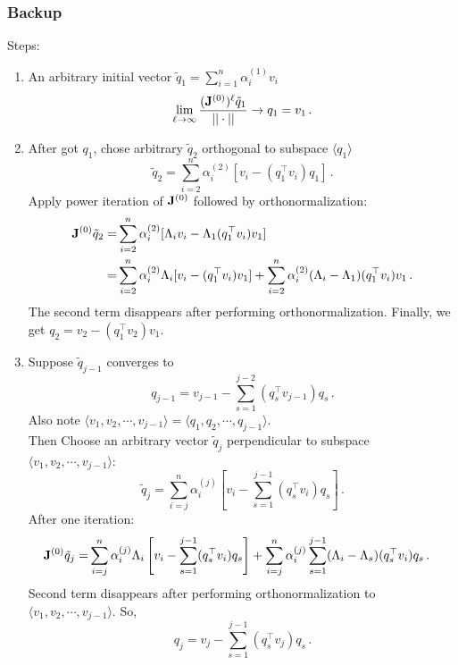 \documentclass[mathserif, handout]{beamer}
\begin{document}
\begin{frame}[allowframebreaks]
  \frametitle{Backup}
  Steps:
  \begin{enumerate}
  \item An arbitrary initial vector
    $\tilde{q}_{1}=\sum_{i=1}^{n}\alpha^{(1)}_{i}v_{i}$
    \[
    \lim_{\ell\to \infty }\frac{(\mathbf{J}^{(0)})^{\ell}\tilde{q}_{1}}{||\cdot||}
    \to q_{1}=v_{1}
    \,.
    \]

  \item After got $q_1$, chose arbitrary $\tilde{q}_{2}$ orthogonal to
    subspace $\langle q_{1} \rangle$
    \[
    \tilde{q}_{2}= \sum_{i=2}^{n}\alpha^{(2)}_{i}[v_{i}-(q_{1}^\top
    v_{i})q_{1}]
    \,.
    \]
    Apply power
    iteration of $\mathbf{J}^{(0)}$ followed by orthonormalization:
    \begin{align*}
      \mathbf{J}^{(0)}\tilde{q}_{2}= &\sum_{i=2}^{n}\alpha^{(2)}_{i}
      [\Lambda_{i}v_{i}-\Lambda_{1}(q_{1}^\top v_{i})v_{1}] \\
      = & \sum_{i=2}^{n}\alpha^{(2)}_{i}\Lambda_{i}[v_{i}-
      (q_{1}^\top v_{i})v_{1}]+\sum_{i=2}^{n}\alpha^{(2)}_{i}
      (\Lambda_{i}-\Lambda_{1})(q_{1}^\top v_{i})v_{1}
      \,.
    \end{align*}
    The second term disappears after performing orthonormalization.
    Finally, we get $q_{2}=v_{2}-(q_{1}^\top v_{2})v_{1}$.


  \item Suppose $\tilde{q}_{j-1}$ converges to
    \[
    q_{j-1}=v_{j-1}-\sum_{s=1}^{j-2}(q_{s}^\top v_{j-1})q_{s}
    \,.
    \]
    Also note $\langle v_{1},v_{2},\cdots,v_{j-1}\rangle=\langle
    q_{1},q_{2},\cdots,q_{j-1}\rangle$. \\
    Then Choose an arbitrary vector
    $\tilde{q}_{j}$ perpendicular to subspace $\langle
    v_{1},v_{2},\cdots,v_{j-1}\rangle$:
    \[
    \tilde{q}_{j}=\sum_{i=j}^{n}\alpha_{i}^{(j)}[v_{i}-\sum_{s=1}^{j-1}
    (q^\top _{s}v_{i})q_{s}]
    \,.
    \]
    After one iteration:
    \begin{align*}
      \mathbf{J}^{(0)}\tilde{q}_{j}
      = & \sum_{i=j}^{n}\alpha^{(j)}_{i}\Lambda_{i}
      \left[v_{i}-\sum_{s=1}^{j-1}(q_{s}^\top v_{i})q_{s}\right]
      +
      \sum_{i=j}^{n}\alpha^{(j)}_{i}\sum_{s=1}^{j-1}
      (\Lambda_{i}-\Lambda_{s})(q_{s}^\top v_{i})q_{s}
      \,.
    \end{align*}
    Second term disappears after performing orthonormalization to
    $\langle  v_{1},v_{2},\cdots,v_{j-1}\rangle$.
    So,
    \[
    q_{j}=v_{j}-\sum_{s=1}^{j-1}(q_{s}^\top v_{j})q_{s}
    \,.
    \]
  \end{enumerate}


\end{frame}
\end{document}
